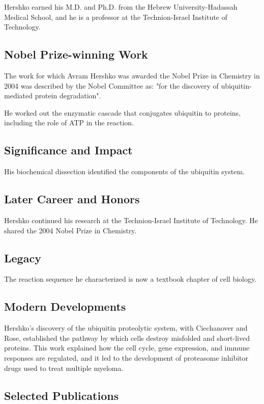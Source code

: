 Hershko earned his M.D. and Ph.D. from the Hebrew University-Hadassah Medical School, and he is a professor at the Technion-Israel Institute of Technology.

\subsection*{Nobel Prize-winning Work}

The work for which Avram Hershko was awarded the Nobel Prize in Chemistry in 2004 was described by the Nobel Committee as: "for the discovery of ubiquitin-mediated protein degradation".

He worked out the enzymatic cascade that conjugates ubiquitin to proteins, including the role of ATP in the reaction.

\subsection*{Significance and Impact}

His biochemical dissection identified the components of the ubiquitin system.

\subsection*{Later Career and Honors}

Hershko continued his research at the Technion-Israel Institute of Technology. He shared the 2004 Nobel Prize in Chemistry.

\subsection*{Legacy}

The reaction sequence he characterized is now a textbook chapter of cell biology.

\subsection*{Modern Developments}

Hershko's discovery of the ubiquitin proteolytic system, with Ciechanover and Rose, established the pathway by which cells destroy misfolded and short-lived proteins. This work explained how the cell cycle, gene expression, and immune responses are regulated, and it led to the development of proteasome inhibitor drugs used to treat multiple myeloma.

\subsection*{Selected Publications}

